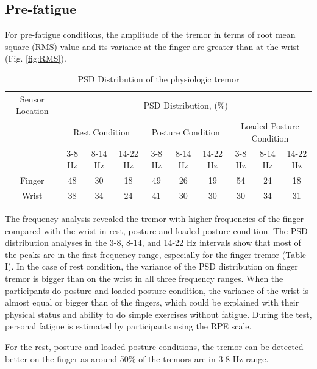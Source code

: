 \documentclass[conference, a4paper]{IEEEtran}
\begin{document}
\subsection{Pre-fatigue}
%
For pre-fatigue conditions, the amplitude of the tremor in terms of root mean square (RMS) value and its variance at the finger are greater than at the wrist (Fig. \ref{fig:RMS}).

%
\begin{table}[!h]
\centering
\begin{tabular}{c c c c c c c c c c}
\toprule
{Sensor Location} & \multicolumn{9}{c}{PSD Distribution, (\%)}{}{} \\
\cmidrule{2-10}
& \multicolumn{3}{c}{Rest Condition} & \multicolumn{3}{c}{Posture Condition} & \multicolumn{3}{c}{Loaded Posture Condition} \\
& {3-8 Hz} & {8-14 Hz} & {14-22 Hz} & {3-8 Hz} & {8-14 Hz} & {14-22 Hz} & {3-8 Hz} & {8-14 Hz} & {14-22 Hz} \\
\midrule \midrule
Finger & 48	& 30 & 18	& 49	& 26	& 19	& 54	& 24	& 18 \\
Wrist  & 38	& 34 & 	24 & 	41 & 30 &	30 &	30 &	34 &	31  \\
\bottomrule
\end{tabular}
\caption{PSD Distribution of the physiologic tremor}
\label{tab:features}
\end{table}
%

The frequency analysis revealed the tremor with higher frequencies of the finger compared with the wrist in rest, posture and loaded posture condition. The PSD distribution analyses in the 3-8, 8-14, and 14-22 Hz intervals show that most of the peaks are in the first frequency range, especially for the finger tremor (Table I). In the case of rest condition, the variance of the PSD distribution on finger tremor is bigger than on the wrist in all three frequency ranges. When the participants do posture and loaded posture condition, the variance of the wrist is almost equal or bigger than of the fingers, which could be explained with their physical status and ability to do simple exercises without fatigue. During the test, personal fatigue is estimated by participants using the RPE scale.

For the rest, posture and loaded posture conditions, the tremor can be detected better on the finger as around 50\% of the tremors are in 3-8 Hz range.
\end{document}
